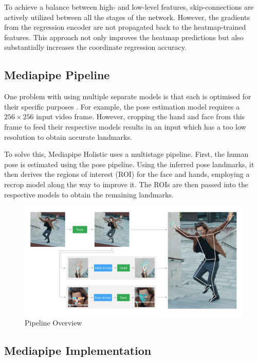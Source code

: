 \documentclass[final,dissertation.tex]{subfiles}
\begin{document}
To achieve a balance between high- and low-level features, skip-connections are actively utilized between all the stages of the network. However, the gradients from the regression encoder are not propagated back to the heatmap-trained features. This approach not only improves the heatmap predictions but also substantially increases the coordinate regression accuracy.

\subsection{Mediapipe Pipeline}

One problem with using multiple separate models is that each is optimised for their specific purposes \cite{grishchenko_bazarevsky_2020}. For example, the pose estimation model requires a $256 \times 256$ input video frame. However, cropping the hand and face from this frame to feed their respective models results in an input which has a too low resolution to obtain accurate landmarks.

To solve this, Mediapipe Holistic uses a multistage pipeline. First, the human pose is estimated using the pose pipeline. Using the inferred pose landmarks, it then derives the regions of interest (ROI) for the face and hands, employing a recrop model along the way to improve it. The ROIs are then passed into the respective models to obtain the remaining landmarks.

\begin{figure}[H]
    \begin{center}
        \includegraphics[width=\textwidth]{images/holistic_pipeline.png}
        \caption[caption]{Pipeline Overview}
    \end{center}
\end{figure}

\subsection{Mediapipe Implementation}
\end{document}

